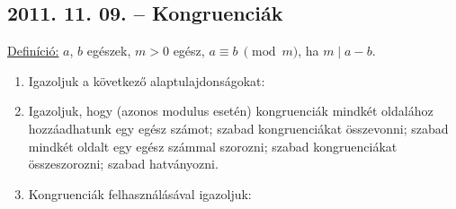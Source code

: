 	\subsection*{2011. 11. 09. -- Kongruenciák}
	\underline{Definíció:} $a$, $b$ egészek, $m>0$ egész, $a\equiv b\ \pmod{m}$, ha $m\mid  a-b$.
	\begin{enumerate}
		\item Igazoljuk a következő alaptulajdonságokat:
		\item Igazoljuk, hogy (azonos modulus esetén) kongruenciák mindkét oldalához hozzáadhatunk egy egész számot; szabad kongruenciákat összevonni; szabad mindkét oldalt egy egész számmal szorozni; szabad kongruenciákat összeszorozni; szabad hatványozni.
		\item Kongruenciák felhasználásával igazoljuk:
	\end{enumerate}
	
	
